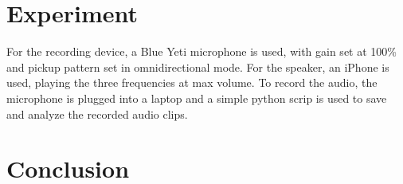 \documentclass[12pt,onecolumn,letterpaper,draftclsnofoot]{article}
\begin{document}
\section{Experiment}

For the recording device, a Blue Yeti microphone is used, with gain set at
100\% and pickup pattern set in omnidirectional mode. For the speaker, an
iPhone is used, playing the three frequencies at max volume. To record the
audio, the microphone is plugged into a laptop and a simple python scrip is
used to save and analyze the recorded audio clips.

\section{Conclusion}

{\small


}
\end{document}
